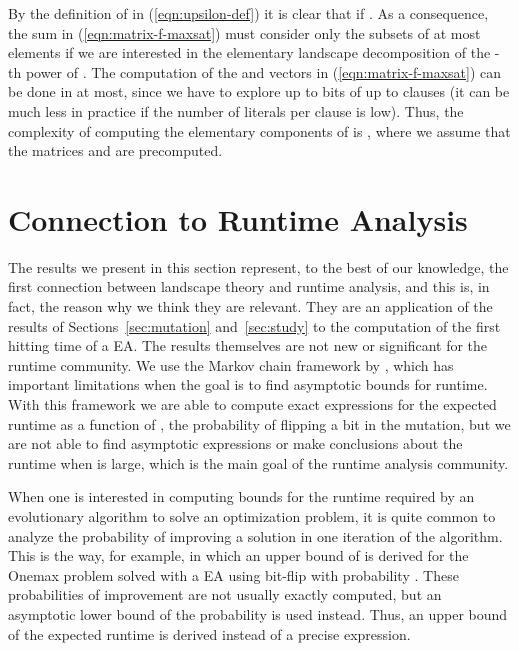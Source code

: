 \documentclass{article}
\begin{document}
By the definition of  in (\ref{eqn:upsilon-def}) it is clear that  if . As a consequence, the sum in (\ref{eqn:matrix-f-maxsat}) must consider only the subsets  of at most  elements if we are interested in the elementary landscape decomposition of the -th power of . The computation of the  and  vectors in (\ref{eqn:matrix-f-maxsat}) can be done in  at most, since we have to explore up to  bits of up to  clauses (it can be much less in practice if the number of literals per clause is low). Thus, the complexity of computing the elementary components of  is , where we assume that the matrices  and  are precomputed.



\section{Connection to Runtime Analysis}
\label{sec:applications}



The results we present in this section represent, to the best of our knowledge, the first connection between landscape theory and runtime analysis, and this is, in fact, the reason why we think they are relevant. They are an application of the results of Sections~\ref{sec:mutation} and~\ref{sec:study} to the computation of the first hitting time of a  EA. The results themselves are not new or significant for the runtime community. We use the Markov chain framework by \cite{He:Yao2003}, which has important limitations when the goal is to find asymptotic bounds for runtime. With this framework we are able to compute exact expressions for the expected runtime as a function of , the probability of flipping a bit in the mutation, but we are not able to find asymptotic expressions or make conclusions about the runtime when  is large, which is the main goal of the runtime analysis community.

When one is interested in computing bounds for the runtime required by an evolutionary algorithm to solve an optimization problem, it is quite common to analyze the probability of improving a solution in one iteration of the algorithm. This is the way, for example, in which an upper bound of  is derived for the Onemax problem solved with a  EA using bit-flip with probability  \citep[p. 39]{Neumann2010}. These probabilities of improvement are not usually exactly computed, but an asymptotic lower bound of the probability is used instead. Thus, an upper bound of the expected runtime is derived instead of a precise expression.
\end{document}
